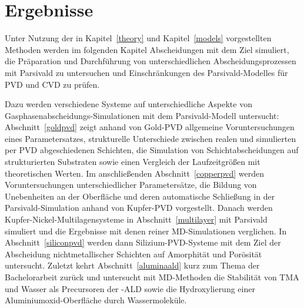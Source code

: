 \chapter{Ergebnisse}
\label{results}

Unter Nutzung der in Kapitel~\ref{theory} und Kapitel~\ref{models} vorgestellten Methoden werden im folgenden Kapitel Abscheidungen mit dem Ziel simuliert, die Präparation und Durchführung von unterschiedlichen Abscheidungsprozessen mit Parsivald zu untersuchen und Einschränkungen des Parsivald-Modelles für PVD und CVD zu prüfen.

Dazu werden verschiedene Systeme auf unterschiedliche Aspekte von Gas\-phasen\-abschei\-dungs-Simu\-la\-tionen mit dem Parsivald-Modell untersucht:
Abschnitt~\ref{goldpvd} zeigt anhand von Gold-PVD allgemeine Voruntersuchungen eines Parametersatzes, strukturelle Unterschiede zwischen realen und simulierten per PVD abgeschiedenen Schichten, die Simulation von Schichtabscheidungen auf strukturierten Substraten sowie einen Vergleich der Laufzeitgrößen mit theoretischen Werten.
Im anschließenden Abschnitt~\ref{copperpvd} werden Voruntersuchungen unterschiedlicher Parametersätze, die Bildung von Unebenheiten an der Oberfläche und deren automatische Schließung in der Parsivald-Simulation anhand von Kupfer-PVD vorgestellt.
Danach werden Kupfer-Nickel-Multi\-lagen\-systeme in Abschnitt~\ref{multilayer} mit Parsivald simuliert und die Ergebnisse mit denen reiner MD-Simulationen verglichen.
In Abschnitt~\ref{siliconpvd} werden dann Silizium-PVD-Systeme mit dem Ziel der Abscheidung nichtmetallischer Schichten auf Amorphität und Porösität untersucht.
Zuletzt kehrt Abschnitt~\ref{aluminaald} kurz zum Thema der Bachelorarbeit zurück und untersucht mit MD-Methoden die Stabilität von TMA und Wasser als Precursoren der -ALD sowie die Hydroxylierung einer Aluminiumoxid-Oberfläche durch Wassermoleküle.

\clearpage

